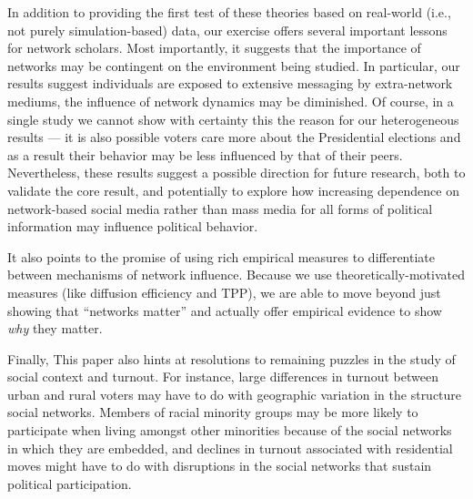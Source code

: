 \documentclass[12pt]{article}
\begin{document}
In addition to providing the first test of these theories based on real-world (i.e., not purely simulation-based) data, our exercise offers several important lessons for network scholars. Most importantly, it suggests that the importance of networks may be contingent on the environment being studied. In particular, our results suggest individuals are exposed to extensive messaging by extra-network mediums, the influence of network dynamics may be diminished. Of course, in a single study we cannot show with certainty this the reason for our heterogeneous results --- it is also possible voters care more about the Presidential elections and as a result their behavior may be less influenced by that of their peers. Nevertheless, these results suggest a possible direction for future research, both to validate the core result, and potentially to explore how increasing dependence on network-based social media rather than mass media for all forms of political information may influence political behavior.

It also points to the promise of using rich empirical measures to differentiate between mechanisms of network influence. Because we use theoretically-motivated measures (like diffusion efficiency and TPP), we are able to move beyond just showing that ``networks matter'' and actually offer empirical evidence to show \emph{why} they matter.

Finally, This paper also hints at resolutions to remaining puzzles in the study of social context and turnout.  For instance, large differences in turnout between urban and rural voters may have to do with geographic variation in the structure social networks.  Members of racial minority groups may be more likely to participate when living amongst other minorities because of the social networks in which they are embedded, and declines in turnout associated with residential moves might have to do with disruptions in the social networks that sustain political participation.

\vspace*{-0.4cm}

\clearpage
\singlespacing
 

\clearpage
\end{document}
